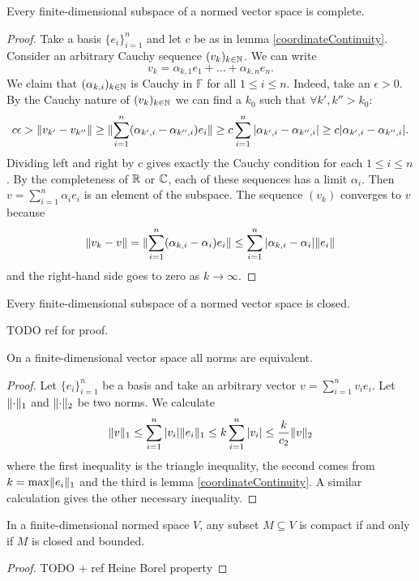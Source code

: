 \begin{proposition} \label{finiteDimComplete}
Every finite-dimensional subspace of a normed vector space is complete.
\end{proposition}
\begin{proof}
Take a basis $\{e_i\}_{i=1}^n$ and let $c$ be as in lemma \ref{coordinateContinuity}. Consider an arbitrary Cauchy sequence $(v_k)_{k\in\mathbb{N}}$. We can write
\[ v_k = \alpha_{k,1}e_1 + \ldots + \alpha_{k,n}e_n. \]
We claim that $(\alpha_{k,i})_{k\in\mathbb{N}}$ is Cauchy in $\mathbb{F}$ for all $1\leq i\leq n$. Indeed, take an $\epsilon>0$. By the Cauchy nature of $(v_k)_{k\in\mathbb{N}}$ we can find a $k_0$ such that $\forall k', k''>k_0:$
\[ c\epsilon > \lVert v_{k'} - v_{k''}\rVert \geq \lVert\sum_{i=1}^n (\alpha_{k',i}-\alpha_{k'',i})e_i\rVert\geq c\sum_{i=1}^n |\alpha_{k',i}-\alpha_{k'',i}| \geq c |\alpha_{k',i}-\alpha_{k'',i}|. \]
Dividing left and right by $c$ gives exactly the Cauchy condition for each $1\leq i\leq n$. By the completeness of $\mathbb{R}$ or $\mathbb{C}$, each of these sequences has a limit $\alpha_i$.
Then $v= \sum_{i=1}^n\alpha_ie_i$ is an element of the subspace. The sequence $(v_k)$ converges to $v$ because
\[ \lVert v_k-v\rVert = \lVert\sum_{i=1}^n (\alpha_{k,i}-\alpha_i)e_i\rVert \leq \sum_{i=1}^n |\alpha_{k,i}-\alpha_i|\lVert e_i\rVert \]
and the right-hand side goes to zero as $k\to \infty$.
\end{proof}
\begin{corollary} \label{finiteDimClosed}
Every finite-dimensional subspace of a normed vector space is closed.
\end{corollary}
TODO ref for proof.

\begin{proposition}
On a finite-dimensional vector space all norms are equivalent.
\end{proposition}
\begin{proof}
Let $\{e_i\}_{i=1}^n$ be a basis and take an arbitrary vector $v = \sum_{i=1}^nv_ie_i$. Let $\lVert\cdot\rVert_1$ and $\lVert\cdot\rVert_2$ be two norms.
We calculate
\[ \lVert v\rVert_1 \leq \sum_{i=1}^n|v_i|\lVert e_i\rVert_1 \leq k\sum_{i=1}^n|v_i| \leq \frac{k}{c_2}\lVert v\rVert_2 \]
where the first inequality is the triangle inequality, the second comes from $k=\max\lVert e_i\rVert_1$ and the third is lemma \ref{coordinateContinuity}. A similar calculation gives the other necessary inequality.
\end{proof}

\begin{proposition}
In a finite-dimensional normed space $V$, any subset $M \subseteq V$ is compact if and only if $M$ is closed and bounded.
\end{proposition}
\begin{proof}
TODO + ref Heine Borel property
\end{proof}


